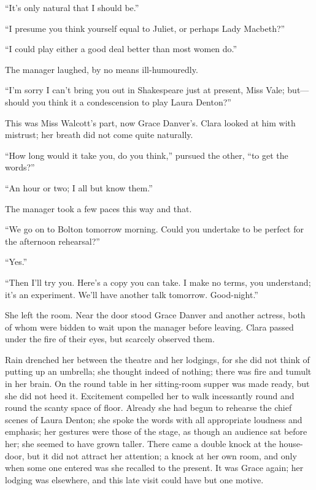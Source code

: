 ``It's only natural that I should be.''

``I presume you think yourself equal to Juliet, or perhaps Lady
Macbeth?''

``I could play either a good deal better than most women do.''

The manager laughed, by no means ill-humouredly.

``I'm sorry I can't bring you out in Shakespeare just at present, Miss
Vale; but---should you think it a condescension to play Laura Denton?''

{\protect\hypertarget{208}{}{}}This was Miss Walcott's part, now Grace
Danver's. Clara looked at him with mistrust; her breath did not come
quite naturally.

``How long would it take you, do you think,'' pursued the other, ``to
get the words?''

``An hour or two; I all but know them.''

The manager took a few paces this way and that.

``We go on to Bolton tomorrow morning. Could you undertake to be perfect
for the afternoon rehearsal?''

``Yes.''

``Then I'll try you. Here's a copy you can take. I make no terms, you
understand; it's an experiment. We'll have another talk tomorrow.
Good-night.''

She left the room. Near the door stood Grace Danver and another actress,
both of whom were bidden to wait upon the manager before leaving. Clara
passed under the fire of their eyes, but scarcely observed them.

Rain drenched her between the theatre and her lodgings, for she did not
think of putting up an umbrella; she thought indeed of
{\protect\hypertarget{209}{}{}}nothing; there was fire and tumult in her
brain. On the round table in her sitting-room supper was made ready, but
she did not heed it. Excitement compelled her to walk incessantly round
and round the scanty space of floor. Already she had begun to rehearse
the chief scenes of Laura Denton; she spoke the words with all
appropriate loudness and emphasis; her gestures were those of the stage,
as though an audience sat before her; she seemed to have grown taller.
There came a double knock at the house-door, but it did not attract her
attention; a knock at her own room, and only when some one entered was
she recalled to the present. It was Grace again; her lodging was
elsewhere, and this late visit could have but one motive.


